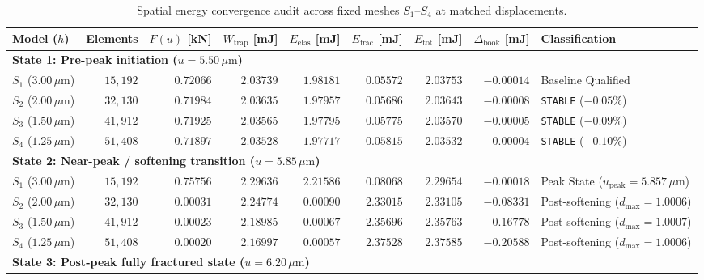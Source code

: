 \begin{table}[htbp]
\centering
\caption{Spatial energy convergence audit across fixed meshes $S_1$--$S_4$ at matched displacements.}
\label{tab:spatial_energy_convergence}
\fontsize{7.0}{8.5}\selectfont
\setlength{\tabcolsep}{2.5pt}
\begin{tabular*}{\textwidth}{@{\extracolsep{\fill}}lrrrrrrrl@{}}
\toprule
\textbf{Model ($h$)} & \textbf{Elements} & \textbf{$F(u)$ [kN]} & \textbf{$W_{\mathrm{trap}}$ [mJ]} & \textbf{$E_{\mathrm{elas}}$ [mJ]} & \textbf{$E_{\mathrm{frac}}$ [mJ]} & \textbf{$E_{\mathrm{tot}}$ [mJ]} & \textbf{$\Delta_{\mathrm{book}}$ [mJ]} & \textbf{Classification} \\
\midrule
\multicolumn{9}{l}{\textbf{State 1: Pre-peak initiation ($u = 5.50\,\mu\mathrm{m}$)}} \\
$S_1$ ($3.00\,\mu\mathrm{m}$) & $15{,}192$ & $0.72066$ & $2.03739$ & $1.98181$ & $0.05572$ & $2.03753$ & $-0.00014$ & Baseline Qualified \\
$S_2$ ($2.00\,\mu\mathrm{m}$) & $32{,}130$ & $0.71984$ & $2.03635$ & $1.97957$ & $0.05686$ & $2.03643$ & $-0.00008$ & \texttt{STABLE} ($-0.05\%$) \\
$S_3$ ($1.50\,\mu\mathrm{m}$) & $41{,}912$ & $0.71925$ & $2.03565$ & $1.97795$ & $0.05775$ & $2.03570$ & $-0.00005$ & \texttt{STABLE} ($-0.09\%$) \\
$S_4$ ($1.25\,\mu\mathrm{m}$) & $51{,}408$ & $0.71897$ & $2.03528$ & $1.97717$ & $0.05815$ & $2.03532$ & $-0.00004$ & \texttt{STABLE} ($-0.10\%$) \\
\midrule
\multicolumn{9}{l}{\textbf{State 2: Near-peak / softening transition ($u = 5.85\,\mu\mathrm{m}$)}} \\
$S_1$ ($3.00\,\mu\mathrm{m}$) & $15{,}192$ & $0.75756$ & $2.29636$ & $2.21586$ & $0.08068$ & $2.29654$ & $-0.00018$ & Peak State ($u_{\mathrm{peak}}=5.857\,\mu\mathrm{m}$) \\
$S_2$ ($2.00\,\mu\mathrm{m}$) & $32{,}130$ & $0.00031$ & $2.24774$ & $0.00090$ & $2.33015$ & $2.33105$ & $-0.08331$ & Post-softening ($d_{\max}=1.0006$) \\
$S_3$ ($1.50\,\mu\mathrm{m}$) & $41{,}912$ & $0.00023$ & $2.18985$ & $0.00067$ & $2.35696$ & $2.35763$ & $-0.16778$ & Post-softening ($d_{\max}=1.0007$) \\
$S_4$ ($1.25\,\mu\mathrm{m}$) & $51{,}408$ & $0.00020$ & $2.16997$ & $0.00057$ & $2.37528$ & $2.37585$ & $-0.20588$ & Post-softening ($d_{\max}=1.0006$) \\
\midrule
\multicolumn{9}{l}{\textbf{State 3: Post-peak fully fractured state ($u = 6.20\,\mu\mathrm{m}$)}} \\

\end{tabular*}
\end{table}
